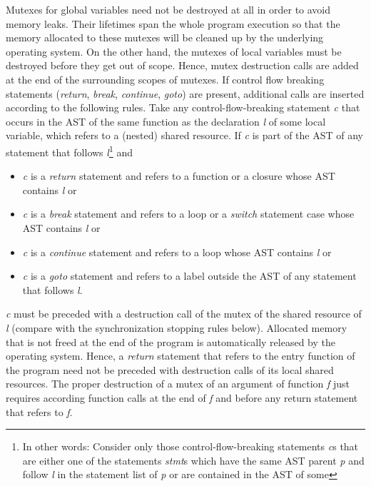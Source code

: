 Mutexes for global variables need not be destroyed at all in order to avoid memory leaks. Their lifetimes span the whole program execution so that the  memory allocated to these mutexes will be cleaned up by the underlying operating system. On the other hand, the mutexes of local variables must be destroyed before they get out of scope. Hence, mutex destruction calls are added at the end of the surrounding scopes of mutexes. If control flow breaking statements (\textit{return}, \textit{break}, \textit{continue}, \textit{goto}) are present, additional calls are inserted according to the following rules. Take any control-flow-breaking statement \textit{c} that occurs in the AST of the same function as the declaration \textit{l} of some local variable, which refers to a (nested) shared resource. If \textit{c} is part of the AST of any statement that follows \textit{l}\footnote{In other words: Consider only those control-flow-breaking statements \textit{c}s that are either one of the statements \textit{stmt}s which have the same AST parent \textit{p} and follow \textit{l} in the statement list of \textit{p} or are contained in the AST of some } and
\begin{itemize}
\item \textit{c} is a \textit{return} statement and refers to a function or a closure whose AST contains \textit{l} or
\item \textit{c} is a \textit{break} statement and refers to a loop or a \textit{switch} statement case whose AST contains \textit{l} or
\item \textit{c} is a \textit{continue} statement and refers to a loop whose AST contains \textit{l} or
\item \textit{c} is a \textit{goto} statement and refers to a label outside the AST of any statement that follows \textit{l}.
\end{itemize}
\textit{c} must be preceded with a destruction call of the mutex of the shared resource of \textit{l} (compare with the synchronization stopping rules below). Allocated memory that is not freed at the end of the program is automatically released by the operating system. Hence, a \textit{return} statement that refers to the entry function of the program need not be preceded with destruction calls of its local shared resources. The proper destruction of a mutex of an argument of function \textit{f} just requires according function calls at the end of \textit{f} and before any return statement that refers to \textit{f}. 

